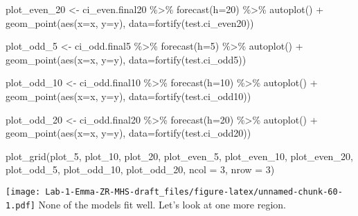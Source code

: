 \documentclass[
]{article}
\newenvironment{Shaded}{\begin{snugshade}}{\end{snugshade}}
\newcommand{\AttributeTok}[1]{\textcolor[rgb]{0.77,0.63,0.00}{#1}}
\newcommand{\DecValTok}[1]{\textcolor[rgb]{0.00,0.00,0.81}{#1}}
\newcommand{\FunctionTok}[1]{\textcolor[rgb]{0.00,0.00,0.00}{#1}}
\newcommand{\NormalTok}[1]{#1}
\newcommand{\OtherTok}[1]{\textcolor[rgb]{0.56,0.35,0.01}{#1}}
\newcommand{\SpecialCharTok}[1]{\textcolor[rgb]{0.00,0.00,0.00}{#1}}
\begin{document}
\begin{Shaded}
\begin{Highlighting}[]
\NormalTok{plot\_even\_20 }\OtherTok{\textless{}{-}}\NormalTok{ ci\_even.final20 }\SpecialCharTok{\%\textgreater{}\%}
  \FunctionTok{forecast}\NormalTok{(}\AttributeTok{h=}\DecValTok{20}\NormalTok{) }\SpecialCharTok{\%\textgreater{}\%}
  \FunctionTok{autoplot}\NormalTok{() }\SpecialCharTok{+} \FunctionTok{geom\_point}\NormalTok{(}\FunctionTok{aes}\NormalTok{(}\AttributeTok{x=}\NormalTok{x, }\AttributeTok{y=}\NormalTok{y), }\AttributeTok{data=}\FunctionTok{fortify}\NormalTok{(test.ci\_even20))}

\NormalTok{plot\_odd\_5 }\OtherTok{\textless{}{-}}\NormalTok{ ci\_odd.final5 }\SpecialCharTok{\%\textgreater{}\%}
  \FunctionTok{forecast}\NormalTok{(}\AttributeTok{h=}\DecValTok{5}\NormalTok{) }\SpecialCharTok{\%\textgreater{}\%}
  \FunctionTok{autoplot}\NormalTok{() }\SpecialCharTok{+} \FunctionTok{geom\_point}\NormalTok{(}\FunctionTok{aes}\NormalTok{(}\AttributeTok{x=}\NormalTok{x, }\AttributeTok{y=}\NormalTok{y), }\AttributeTok{data=}\FunctionTok{fortify}\NormalTok{(test.ci\_odd5))}

\NormalTok{plot\_odd\_10 }\OtherTok{\textless{}{-}}\NormalTok{ ci\_odd.final10 }\SpecialCharTok{\%\textgreater{}\%}
  \FunctionTok{forecast}\NormalTok{(}\AttributeTok{h=}\DecValTok{10}\NormalTok{) }\SpecialCharTok{\%\textgreater{}\%}
  \FunctionTok{autoplot}\NormalTok{() }\SpecialCharTok{+} \FunctionTok{geom\_point}\NormalTok{(}\FunctionTok{aes}\NormalTok{(}\AttributeTok{x=}\NormalTok{x, }\AttributeTok{y=}\NormalTok{y), }\AttributeTok{data=}\FunctionTok{fortify}\NormalTok{(test.ci\_odd10))}

\NormalTok{plot\_odd\_20 }\OtherTok{\textless{}{-}}\NormalTok{ ci\_odd.final20 }\SpecialCharTok{\%\textgreater{}\%}
  \FunctionTok{forecast}\NormalTok{(}\AttributeTok{h=}\DecValTok{20}\NormalTok{) }\SpecialCharTok{\%\textgreater{}\%}
  \FunctionTok{autoplot}\NormalTok{() }\SpecialCharTok{+} \FunctionTok{geom\_point}\NormalTok{(}\FunctionTok{aes}\NormalTok{(}\AttributeTok{x=}\NormalTok{x, }\AttributeTok{y=}\NormalTok{y), }\AttributeTok{data=}\FunctionTok{fortify}\NormalTok{(test.ci\_odd20))}

\FunctionTok{plot\_grid}\NormalTok{(plot\_5, plot\_10, plot\_20, plot\_even\_5, plot\_even\_10, plot\_even\_20, plot\_odd\_5, plot\_odd\_10, plot\_odd\_20, }\AttributeTok{ncol =} \DecValTok{3}\NormalTok{, }\AttributeTok{nrow =} \DecValTok{3}\NormalTok{)}
\end{Highlighting}
\end{Shaded}

\texttt{[image: Lab-1-Emma-ZR-MHS-draft\_files/figure-latex/unnamed-chunk-60-1.pdf]}
None of the models fit well. Let's look at one more region.
\end{document}
